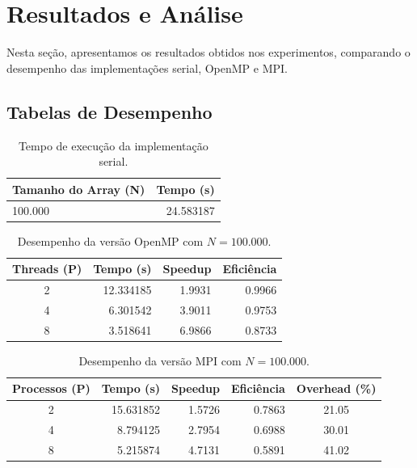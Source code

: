 \documentclass[12pt, a4paper]{article}
\begin{document}
\section{Resultados e Análise}
Nesta seção, apresentamos os resultados obtidos nos experimentos, comparando o desempenho das implementações serial, OpenMP e MPI.


\subsection{Tabelas de Desempenho}

\begin{table}[H]
\centering
\caption{Tempo de execução da implementação serial.}
\label{tab:serial}
\begin{tabular}{@{}lr@{}}
\toprule
\textbf{Tamanho do Array (N)} & \textbf{Tempo (s)} \\ \midrule
100.000                       & 24.583187          \\ \bottomrule
\end{tabular}
\end{table}

\begin{table}[H]
\centering
\caption{Desempenho da versão OpenMP com $N=100.000$.}
\label{tab:openmp}
\begin{tabular}{@{}crrr@{}}
\toprule
\textbf{Threads (P)} & \textbf{Tempo (s)} & \textbf{Speedup} & \textbf{Eficiência} \\ \midrule
2                    & 12.334185          & 1.9931           & 0.9966              \\
4                    & 6.301542           & 3.9011           & 0.9753              \\
8                    & 3.518641           & 6.9866           & 0.8733              \\ \bottomrule
\end{tabular}
\end{table}

\begin{table}[H]
\centering
\caption{Desempenho da versão MPI com $N=100.000$.}
\label{tab:mpi}
\begin{tabular}{@{}crrrc@{}}
\toprule
\textbf{Processos (P)} & \textbf{Tempo (s)} & \textbf{Speedup} & \textbf{Eficiência} & \textbf{Overhead (\%)} \\ \midrule
2                      & 15.631852          & 1.5726           & 0.7863              & 21.05                 \\
4                      & 8.794125           & 2.7954           & 0.6988              & 30.01                 \\
8                      & 5.215874           & 4.7131           & 0.5891              & 41.02                 \\ \bottomrule
\end{tabular}
\end{table}
\end{document}
